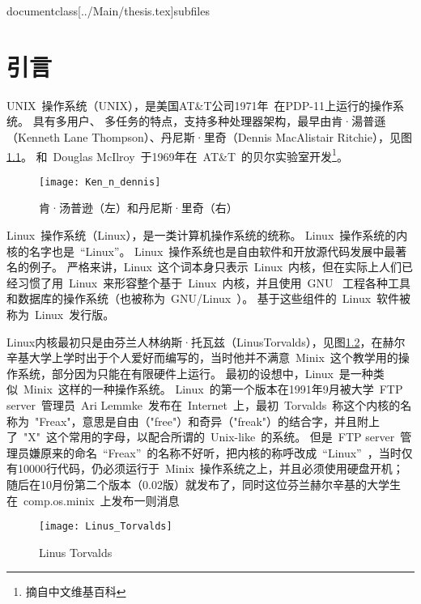 documentclass[../Main/thesis.tex]{subfiles}


\chapter{引言}
\label{cha:intro}
UNIX~操作系统（UNIX），是美国AT\&T公司1971年~在PDP-11上运行的操作系统。
具有多用户、 多任务的特点，支持多种处理器架构，最早由肯·湯普遜（Kenneth Lane Thompson）、丹尼斯·里奇（Dennis MacAlistair Ritchie），见图\ref{fig:ken}。
和~Douglas McIlroy~于1969年在~AT\&T~的贝尔实验室开发\footnote{摘自中文维基百科}。

\begin{figure}[htbp]
  \centering
  \texttt{[image: Ken\_n\_dennis]}
  \caption{肯·汤普逊（左）和丹尼斯·里奇（右）}
  \label{fig:ken}
\end{figure}
Linux~操作系统（Linux），是一类计算机操作系统的统称。
Linux~操作系统的内核的名字也是~“Linux”。
Linux~操作系统也是自由软件和开放源代码发展中最著名的例子。
严格来讲，Linux~这个词本身只表示~Linux~内核，但在实际上人们已经习惯了用~Linux~来形容整个基于~Linux~内核，并且使用~GNU~ 工程各种工具和数据库的操作系统（也被称为~GNU/Linux~）。
基于这些组件的~Linux~软件被称为~Linux~发行版。

Linux内核最初只是由芬兰人林纳斯·托瓦兹（LinusTorvalds），见图\ref{fig:linus}，在赫尔辛基大学上学时出于个人爱好而编写的，当时他并不满意~Minix~这个教学用的操作系统，部分因为只能在有限硬件上运行。
最初的设想中，Linux~是一种类似~Minix~这样的一种操作系统。
Linux~的第一个版本在1991年9月被大学~FTP server~管理员~Ari Lemmke~发布在~Internet~上，最初~Torvalds~称这个内核的名称为~"Freax"，意思是自由（"free"）和奇异（"freak"）的结合字，并且附上了~"X"~这个常用的字母，以配合所谓的~Unix-like~的系统。
但是~FTP server~管理员嫌原来的命名~“Freax”~的名称不好听，把内核的称呼改成~“Linux”~，当时仅有10000行代码，仍必须运行于~Minix~操作系统之上，并且必须使用硬盘开机；
随后在10月份第二个版本（0.02版）就发布了，同时这位芬兰赫尔辛基的大学生在~comp.os.minix~上发布一则消息

\begin{center}
\end{center}
\begin{figure}[htbp]
  \centering
  \texttt{[image: Linus\_Torvalds]}
  \caption{Linus Torvalds}
  \label{fig:linus}
\end{figure}

